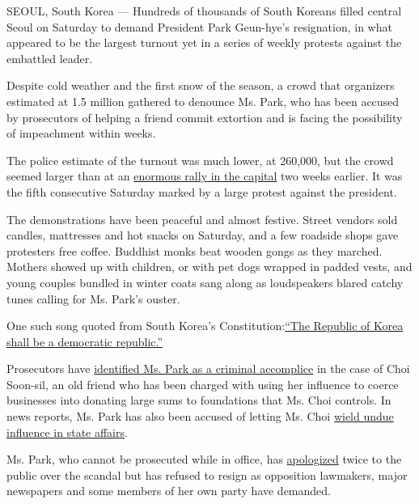 SEOUL, South Korea --- Hundreds of thousands of South Koreans filled
central Seoul on Saturday to demand President Park Geun-hye's
resignation, in what appeared to be the largest turnout yet in a series
of weekly protests against the embattled leader.

Despite cold weather and the first snow of the season, a crowd that
organizers estimated at 1.5 million gathered to denounce Ms. Park, who
has been accused by prosecutors of helping a friend commit extortion and
is facing the possibility of impeachment within weeks.

The police estimate of the turnout was much lower, at 260,000, but the
crowd seemed larger than at an
\href{http://www.nytimes3xbfgragh.onion/2016/11/13/world/asia/korea-park-geun-hye-protests.html}{enormous
rally in the capital} two weeks earlier. It was the fifth consecutive
Saturday marked by a large protest against the president.

The demonstrations have been peaceful and almost festive. Street vendors
sold candles, mattresses and hot snacks on Saturday, and a few roadside
shops gave protesters free coffee. Buddhist monks beat wooden gongs as
they marched. Mothers showed up with children, or with pet dogs wrapped
in padded vests, and young couples bundled in winter coats sang along as
loudspeakers blared catchy tunes calling for Ms. Park's ouster.

One such song quoted from South Korea's
Constitution:\href{http://www.ilo.org/wcmsp5/groups/public/---ed_protect/---protrav/---ilo_aids/documents/legaldocument/wcms_117333.pdf}{``The
Republic of Korea shall be a democratic republic.''}

Prosecutors have
\href{http://www.nytimes3xbfgragh.onion/2016/11/20/world/asia/park-geun-hye-south-korea-extortion-accomplice-prosecutors.html}{identified
Ms. Park as a criminal accomplice} in the case of Choi Soon-sil, an old
friend who has been charged with using her influence to coerce
businesses into donating large sums to foundations that Ms. Choi
controls. In news reports, Ms. Park has also been accused of letting Ms.
Choi
\href{http://www.nytimes3xbfgragh.onion/2016/10/28/world/asia/south-korea-choi-soon-sil.html}{wield
undue influence in state affairs}.

Ms. Park, who cannot be prosecuted while in office, has
\href{http://www.nytimes3xbfgragh.onion/2016/11/04/world/asia/south-korea-park-geun-hye-investigation.html}{apologized}
twice to the public over the scandal but has refused to resign as
opposition lawmakers, major newspapers and some members of her own party
have demanded.

